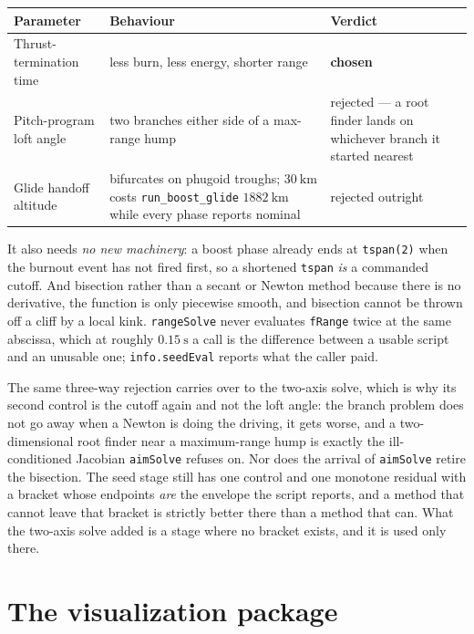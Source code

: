 \documentclass[11pt]{article}
\newcommand{\code}[1]{\texttt{#1}}
\begin{document}
\begin{center}
\begin{tabular}{p{3.0cm}p{5.1cm}p{6.3cm}}
\toprule
Parameter & Behaviour & Verdict \\
\midrule
Thrust-termination time & less burn, less energy, shorter range & \textbf{chosen} \\
Pitch-program loft angle & two branches either side of a max-range hump & rejected --- a root finder lands on whichever branch it started nearest \\
Glide handoff altitude & bifurcates on phugoid troughs; $30~\mathrm{km}$ costs \code{run\_boost\_glide} $1882~\mathrm{km}$ while every phase reports nominal & rejected outright \\
\bottomrule
\end{tabular}
\end{center}

It also needs \emph{no new machinery}: a boost phase already ends at
\code{tspan(2)} when the burnout event has not fired first, so a shortened
\code{tspan} \emph{is} a commanded cutoff. And bisection rather than a secant
or Newton method because there is no derivative, the function is only
piecewise smooth, and bisection cannot be thrown off a cliff by a local kink.
\code{rangeSolve} never evaluates \code{fRange} twice at the same abscissa,
which at roughly $0.15~\mathrm{s}$ a call is the difference between a usable
script and an unusable one; \code{info.seedEval} reports what the caller paid.

The same three-way rejection carries over to the two-axis solve, which is why
its second control is the cutoff again and not the loft angle: the branch
problem does not go away when a Newton is doing the driving, it gets worse, and
a two-dimensional root finder near a maximum-range hump is exactly the
ill-conditioned Jacobian \code{aimSolve} refuses on. Nor does the arrival of
\code{aimSolve} retire the bisection. The seed stage still has one control and
one monotone residual with a bracket whose endpoints \emph{are} the envelope
the script reports, and a method that cannot leave that bracket is strictly
better there than a method that can. What the two-axis solve added is a stage
where no bracket exists, and it is used only there.

\section{The visualization package}
\label{sec:viz}
\end{document}
